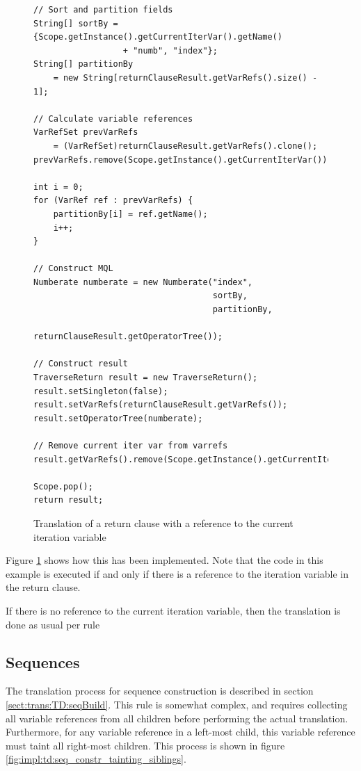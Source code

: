 \begin{figure}[!htp]
\begin{center}
\lstset{language=Java,numbers=left}
\begin{lstlisting}
// Sort and partition fields
String[] sortBy = {Scope.getInstance().getCurrentIterVar().getName() 
		          + "numb", "index"};
String[] partitionBy 
	= new String[returnClauseResult.getVarRefs().size() - 1];

// Calculate variable references
VarRefSet prevVarRefs 
	= (VarRefSet)returnClauseResult.getVarRefs().clone();         
prevVarRefs.remove(Scope.getInstance().getCurrentIterVar());

int i = 0;
for (VarRef ref : prevVarRefs) {
    partitionBy[i] = ref.getName();
    i++;
}

// Construct MQL
Numberate numberate = new Numberate("index", 
                                    sortBy, 
                                    partitionBy, 
                                    returnClauseResult.getOperatorTree());

// Construct result
TraverseReturn result = new TraverseReturn();
result.setSingleton(false);
result.setVarRefs(returnClauseResult.getVarRefs());
result.setOperatorTree(numberate);

// Remove current iter var from varrefs
result.getVarRefs().remove(Scope.getInstance().getCurrentIterVar());

Scope.pop();
return result;
\end{lstlisting}
  \caption{Translation of a return clause with a reference to the current
  iteration variable}
  \label{fig:impl:td:for_return_withref}
\end{center}
\end{figure}

Figure \ref{fig:impl:td:for_return_withref} shows how this has been
implemented. Note that the code in this example is executed if and only if
there is a reference to the iteration variable in the return clause.

If there is no reference to the current iteration variable, then the
translation is done as usual per rule 

\subsection{Sequences}
\label{sect:impl:td:seq}
The translation process for sequence construction is described in section
\ref{sect:trans:TD:seqBuild}. This rule is somewhat complex, and requires
collecting all variable references from all children before performing the
actual translation. Furthermore, for any variable reference in a left-most
child, this variable reference must taint all right-most children. This process
is shown in figure \ref{fig:impl:td:seq_constr_tainting_siblings}.

